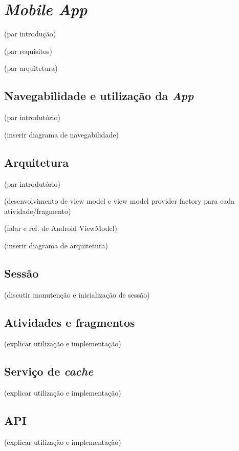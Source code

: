\section{\textit{Mobile App}}

(par introdução)

(par requisitos)

(par arquitetura)

\subsection{Navegabilidade e utilização da \textit{App}}

(par introdutório)

(inserir diagrama de navegabilidade)

\subsection{Arquitetura}

(par introdutório)

(desenvolvimento de view model e view model provider factory para cada atividade/fragmento)

(falar e ref. de Android ViewModel)

(inserir diagrama de arquitetura)

\subsection{Sessão}

(discutir manutenção e inicialização de sessão)

\subsection{Atividades e fragmentos}

(explicar utilização e implementação)

\subsection{Serviço de \textit{cache}}

(explicar utilização e implementação)

\subsection{API}

(explicar utilização e implementação)